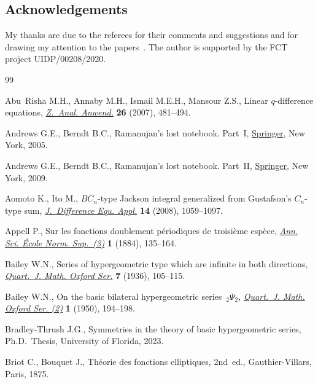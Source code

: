 \documentclass[pdftex]{sigma}
\numberwithin{equation}{section}
\begin{document}
\subsection*{Acknowledgements}
My thanks are due to the referees for their comments and suggestions and for drawing my attention to the papers~\cite{Ito2014,Ito2008, Rosengren2006}. The author is supported by the FCT project UIDP/00208/2020.

\begin{thebibliography}{99}
\footnotesize\itemsep=0pt

Abu~Risha M.H., Annaby M.H., Ismail M.E.H., Mansour Z.S., Linear
 {$q$}-difference equations,
 \href{https://doi.org/10.4171/ZAA/1338}{\textit{Z.~Anal. Anwend.}}
 \textbf{26} (2007), 481--494.

Andrews G.E., Berndt B.C., Ramanujan's lost notebook. {P}art~{I},
 \href{https://doi.org/10.1007/0-387-28124-X}{Springer}, New York, 2005.

Andrews G.E., Berndt B.C., Ramanujan's lost notebook. {P}art~{II},
 \href{https://doi.org/10.1007/b13290}{Springer}, New York, 2009.

Aomoto K., Ito M., {$BC_n$}-type {J}ackson integral generalized from
 {G}ustafson's {$C_n$}-type sum,
 \href{https://doi.org/10.1080/10236190701776043}{\textit{J.~Difference Equ.
 Appl.}} \textbf{14} (2008), 1059--1097.

Appell P., Sur les fonctions doublement p\'eriodiques de troisi\`eme esp\`ece,
 \href{https://doi.org/10.24033/asens.236}{\textit{Ann. Sci. \'Ecole Norm.
 Sup.~(3)}} \textbf{1} (1884), 135--164.

Bailey W.N., Series of hypergeometric type which are infinite in both
 directions, \href{https://doi.org/10.1093/qmath/os-7.1.105}{\textit{Quart.~J.
 Math. Oxford Ser.}} \textbf{7} (1936), 105--115.

Bailey W.N., On the basic bilateral hypergeometric series~{${}_2\Psi_2$},
 \href{https://doi.org/10.1093/qmath/1.1.194}{\textit{Quart.~J. Math. Oxford
 Ser. (2)}} \textbf{1} (1950), 194--198.

Bradley-Thrush J.G., Symmetries in the theory of basic hypergeometric series,
 Ph.D.~Thesis, {U}niversity of Florida, 2023.

Briot C., Bouquet J., Th\'eorie des fonctions elliptiques, 2nd~ed.,
 Gauthier-Villars, Paris, 1875.


\end{thebibliography}
\end{document}
